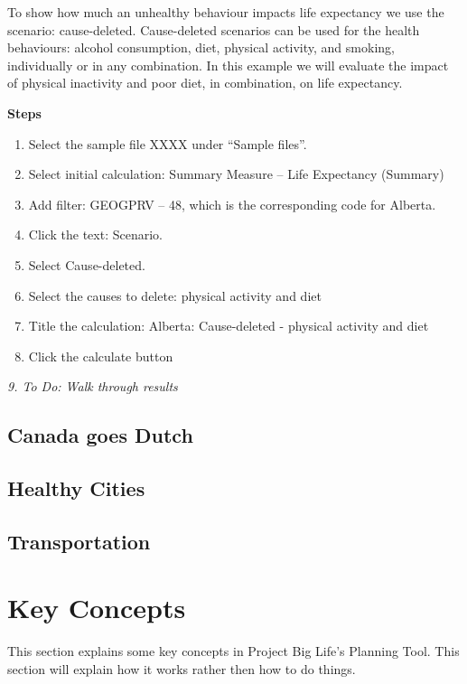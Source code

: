 \documentclass[]{book}
\begin{document}
To show how much an unhealthy behaviour impacts life expectancy we use
the scenario: cause-deleted. Cause-deleted scenarios can be used for the
health behaviours: alcohol consumption, diet, physical activity, and
smoking, individually or in any combination. In this example we will
evaluate the impact of physical inactivity and poor diet, in
combination, on life expectancy.

\textbf{Steps}

\begin{enumerate}
\def\labelenumi{\arabic{enumi}.}
\item
  Select the sample file XXXX under ``Sample files''.
\item
  Select initial calculation: Summary Measure -- Life Expectancy
  (Summary)
\item
  Add filter: GEOGPRV -- 48, which is the corresponding code for
  Alberta.
\item
  Click the text: Scenario.
\item
  Select Cause-deleted.
\item
  Select the causes to delete: physical activity and diet
\item
  Title the calculation: Alberta: Cause-deleted - physical activity and
  diet
\item
  Click the calculate button
\end{enumerate}

\emph{9. To Do: Walk through results}

\section{Canada goes Dutch}\label{canada-goes-dutch}

\section{Healthy Cities}\label{healthy-cities}

\section{Transportation}\label{transportation}

\chapter{Key Concepts}\label{keyconcepts}

This section explains some key concepts in Project Big Life's Planning
Tool. This section will explain how it works rather then how to do
things.
\end{document}

